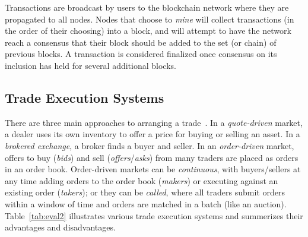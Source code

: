Transactions are broadcast by users to the blockchain network where they are propagated to all nodes. Nodes that choose to \emph{mine} will collect transactions (in the order of their choosing) into a block, and will attempt to have the network reach a consensus that their block should be added to the set (or chain) of previous blocks. A transaction is considered finalized once consensus on its inclusion has held for several additional blocks.

%
\subsection{Trade Execution Systems}

There are three main approaches to arranging a trade~\cite{Har03}. In a \emph{quote-driven} market, a dealer uses its own inventory to offer a price for buying or selling an asset. In a \emph{brokered exchange}, a broker finds a buyer and seller. In an \emph{order-driven} market, offers to buy (\emph{bids}) and sell (\emph{offers}/\emph{asks}) from many traders are placed as orders in an order book. Order-driven markets can be \emph{continuous}, with buyers/sellers at any time adding orders to the order book (\emph{makers}) or executing against an existing order (\emph{takers}); or they can be \emph{called}, where all traders submit orders within a window of time and orders are matched in a batch (like an auction). Table~\ref{tab:eval2} illustrates various trade execution systems and summerizes their advantages and disadvantages.


